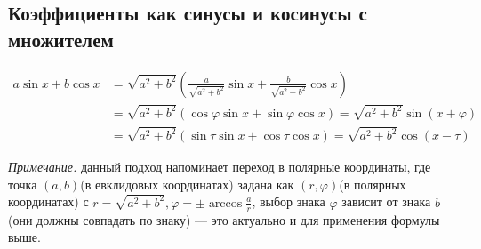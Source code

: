 \subsection*{Коэффициенты как синусы и косинусы с множителем}

\begin{align*}
  a \sin x + b \cos x &= \sqrt{a^2+b^2} \left(\frac{a}{\sqrt{a^2+b^2}} \sin x + \frac{b}{\sqrt{a^2+b^2}}\cos x\right) \\ 
  &= \sqrt{a^2+b^2} (\cos \varphi \sin x + \sin \varphi \cos x) = \sqrt{a^2+b^2} \sin(x + \varphi) \\
  &= \sqrt{a^2+b^2} (\sin \tau \sin x + \cos \tau \cos x) = \sqrt{a^2+b^2} \cos(x - \tau)
\end{align*}

\textit{Примечание.} данный подход напоминает переход в полярные координаты, где точка $(a,b)$(в евклидовых координатах) задана как $(r,\varphi)$(в полярных координатах) с $r=\sqrt{a^2+b^2}, \varphi = \pm \arccos\frac{a}{r}$, выбор знака $\varphi$ зависит от знака $b$ (они должны совпадать по знаку) --- это актуально и для применения формулы выше.
